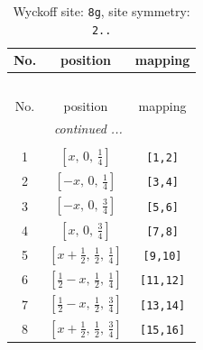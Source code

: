 \documentclass[fleqn,8pt]{jsarticle}
\begin{document}
\renewcommand{\arraystretch}{1.2}
\begin{longtable}{ccc}
\caption{Wyckoff site: {\tt 8g}, site symmetry: {\tt 2..}}
 \\
 \hline \hline
No. & position & mapping \\ \hline \endfirsthead

\multicolumn{2}{l}{\tablename\ \thetable{}} \\
 \hline \hline
No. & position & mapping \\ \hline \endhead

 \hline \hline
\multicolumn{2}{r}{\footnotesize\it continued ...} \\ \endfoot

 \hline \hline
\multicolumn{2}{r}{} \\ \endlastfoot

1 & $\left[ x,\, 0,\, \frac{1}{4} \right]$ & {\tt [1,2]} \\ \hline
2 & $\left[ - x,\, 0,\, \frac{1}{4} \right]$ & {\tt [3,4]} \\ \hline
3 & $\left[ - x,\, 0,\, \frac{3}{4} \right]$ & {\tt [5,6]} \\ \hline
4 & $\left[ x,\, 0,\, \frac{3}{4} \right]$ & {\tt [7,8]} \\ \hline
5 & $\left[ x + \frac{1}{2},\, \frac{1}{2},\, \frac{1}{4} \right]$ & {\tt [9,10]} \\ \hline
6 & $\left[ \frac{1}{2} - x,\, \frac{1}{2},\, \frac{1}{4} \right]$ & {\tt [11,12]} \\ \hline
7 & $\left[ \frac{1}{2} - x,\, \frac{1}{2},\, \frac{3}{4} \right]$ & {\tt [13,14]} \\ \hline
8 & $\left[ x + \frac{1}{2},\, \frac{1}{2},\, \frac{3}{4} \right]$ & {\tt [15,16]} \\
\end{longtable}
\renewcommand{\arraystretch}{1.2}
\end{document}
